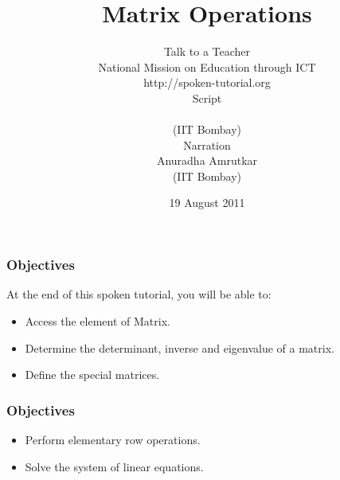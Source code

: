 \documentclass[17pt]{beamer}
\begin{document}
\sffamily 
\bfseries
\title
[ Matrix Operations
\hspace{0.5cm}
\insertframenumber/\inserttotalframenumber]
{\normalsize Matrix Operations}
\vspace{-1 cm}
\author[ Script-Shalini \\ Narration-Anuradha]{{ \small Talk to a Teacher \\ National Mission on Education through ICT \\ http://spoken-tutorial.org }\\{\scriptsize Script }\\ \vspace{-0.2cm}{\small Shalini Shrivastava}\vspace{-0.3cm} \\{\scriptsize (IIT Bombay) } \vspace{-0.2cm}\\{\scriptsize Narration} \vspace{-0.2cm}\\  {\small Anuradha Amrutkar}\vspace{-0.3cm} \\{\scriptsize (IIT Bombay)}\vspace{-1 cm}}

\date{ \scriptsize 19 August 2011}

\begin{frame}
\maketitle
\end{frame}





\begin{frame}[fragile]
\frametitle{Objectives }
At the end of this spoken tutorial, you will be able to:
\begin{itemize}
\item Access the element of Matrix. \pause
\item Determine the determinant, inverse and eigenvalue of a matrix.\pause
\item Define the special matrices.
\end{itemize}
\end{frame}


\begin{frame}[fragile]
\frametitle{Objectives }
\begin{itemize}
\item Perform elementary row operations. \pause
\item Solve the system of linear equations.
\end{itemize}
\end{frame}
\end{document}
